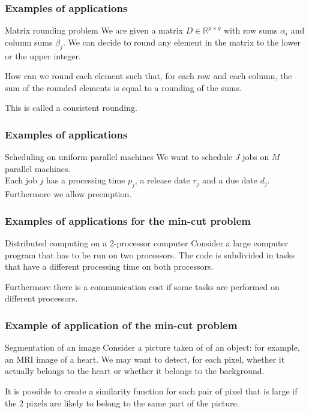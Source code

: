 \documentclass[9pt]{beamer}
\begin{document}
\begin{frame}
\frametitle{Examples of applications}
\begin{block}{Matrix rounding problem}
We are given a \alert{matrix} $D\in \mathbb R^{p\times q}$
with row sums $\alpha_i$ and column sums $\beta_j$.
We can decide to round any element in the matrix to the \alert{lower}
or the \alert{upper} integer.\bigskip

How can we round each element such that, for each row
and each column,  the sum of the \alert{rounded elements}
is equal to a \alert{rounding of the sums}.\bigskip

This is called a \alert{consistent rounding}.
\end{block}
\end{frame}
\begin{frame}
\frametitle{Examples of applications}
\begin{block}{Scheduling on uniform parallel machines}
We want to schedule $J$ jobs on $M$ parallel machines.\\
Each job $j$ has a \alert{processing time} $p_j$,
a \alert{release date} $r_j$ and a \alert{due date } $d_j$.
Furthermore we allow \alert{preemption}.
\end{block}
\end{frame}
\begin{frame}
\frametitle{Examples of applications for the min-cut problem}
\begin{block}{Distributed computing on a 2-processor computer}
Consider a \alert{large computer program} that has to be run
on \alert{two processors}. The code is subdivided in \alert{tasks}
that have a different processing time on both processors.

Furthermore there is a \alert{communication cost} if some
tasks are performed on \alert{different processors}.
\end{block}
\end{frame}
\begin{frame}
\frametitle{Example of application of the min-cut problem}
\begin{block}{Segmentation of an image}
Consider a picture taken of of an object: for example, an MRI image of a heart.
We may want to detect, for each pixel, whether it actually belongs to
the heart or whether it belongs to the background.\bigskip

It is possible to create a \alert{similarity function} for each pair of pixel
that is \alert{large} if the 2 pixels are likely to belong to the same part of the picture.
\end{block}
\end{frame}
\end{document}
